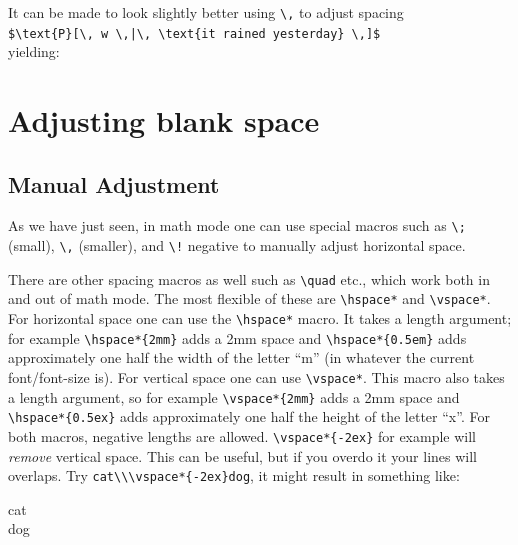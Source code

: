 \documentclass{article}
\newcommand*\𝚝[1]{\texttt{#1}}%
\begin{document}
It can be made to look slightly better using \verb|\,| to adjust spacing\\

\𝚝{\$\textbackslash text\{P\}[\textbackslash, w \textbackslash,|\textbackslash, \textbackslash text\{it rained yesterday\} \textbackslash,]\$}\\[.5ex]
yielding:
\begin{center}\end{center}




\section*{Adjusting blank space}
\subsection*{Manual Adjustment}
As we have just seen, in math mode one can use special macros such as \verb|\;| (small),  \verb|\,| (smaller), and \verb|\!| negative
to manually adjust horizontal space.

There are other spacing macros as well such as \verb|\quad| etc., which work both in and out of math mode.
The most flexible of these are \verb|\hspace*| and \verb|\vspace*|.
For horizontal space one can use the \verb|\hspace*| macro.
It takes a length argument; for example \verb|\hspace*{2mm}| adds a 2mm space and \verb|\hspace*{0.5em}| adds approximately one
half the width of the letter ``m'' (in whatever the current font/font-size is).  For vertical space one can use
\verb|\vspace*|.  This macro also takes a length argument, so for example \verb|\vspace*{2mm}| adds a 2mm space
and \verb|\hspace*{0.5ex}| adds approximately one half the height of the letter ``x''.
For both macros, negative lengths are allowed.
\verb|\vspace*{-2ex}| for example will \textit{remove} vertical space.
This can be useful, but if you overdo it your lines will overlaps.
Try \verb|cat\\\vspace*{-2ex}dog|, it might result in something like:
%
\begin{center}cat\\\vspace*{-2ex}dog\end{center}
\end{document}
